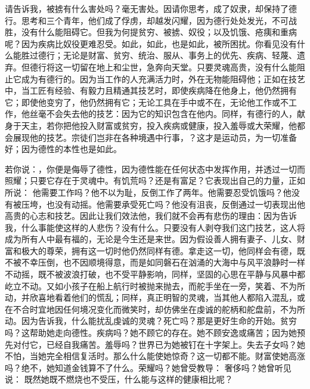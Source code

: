 请告诉我，被掳有什么害处吗？毫无害处。因请你思考，成了奴隶，却保持了德行。思考和三个青年，他们成了俘虏，却越发闪耀，因为德行处处发光，不可战胜，没有什么能阻碍它。但我为何提贫穷、被掳、奴役；以及饥饿、疮痍和重病呢？因为疾病比奴役更难忍受。如此，如此，也是如此，被所困扰。你看见没有什么能胜过德行；无论是财富、贫穷、统治、服从、事务上的优先、疾病、轻蔑、遗弃。但德行将这一切留在地上和尘世，急奔向天堂。只要灵魂高贵，没有什么能阻止它成为有德行的。因为当工作的人充满活力时，外在无物能阻碍他；正如在技艺中，当工匠有经验、有毅力且精通其技艺时，即使疾病降在他身上，他仍然拥有它；即使他变穷了，他仍然拥有它；无论工具在手中或不在，无论他工作或不工作，他丝毫不会失去他的技艺：因为它的知识包含在他内。同样，有德行的人，献身于天主，若你把他投入财富或贫穷，投入疾病或健康，投入羞辱或大荣耀，他都会展现他的技艺。宗徒们岂非在各种境遇中行事，？这才是运动员，为一切准备好；因为德性的本性也是如此。\par

若你说：，你便是侮辱了德性，因为德性能在任何状态中发挥作用，并透过一切而照耀；只要它存在于灵魂中。有饥荒吗？还是有富足？它表现出自己的力量，正如所说： 他需要工作吗？他不以为耻，反倒工作了两年。他需要忍受饥饿吗？他没有被压垮，也没有动摇。他需要承受死亡吗？他没有沮丧，反倒通过一切表现出他高贵的心志和技艺。因此让我们效法他，我们就不会再有悲伤的理由：因为告诉我，什么事能使这样的人悲伤？没有什么。只要没有人剥夺我们这门技艺，这人将成为所有人中最有福的，无论是今生还是来世。因为假设善人拥有妻子、儿女、财富和极大的尊荣，拥有这一切时他仍然同样有德。拿走这一切，他同样会有德，既不被不幸压倒，也不因顺境得意，而是如同磐石在汹涌的大海中与风平浪静时一样不动摇，既不被波浪打破，也不受平静影响，同样，坚固的心思在平静与风暴中都屹立不动。又如小孩子在船上航行时被抛来抛去，而舵手坐在一旁，笑着、不为所动，并欣喜地看着他们的慌乱；同样，真正明智的灵魂，当其他人都陷入混乱，或在不合时宜地因任何境况变化而微笑时，却仿佛坐在虔诚的舵柄和舵盘前，不为所动。因为告诉我，什么能扰乱虔诚的灵魂？死亡吗？那是更好生命的开始。贫穷吗？这帮助她走向德性。疾病吗？她不顾它的存在。她不顾安逸或痛苦；因为她预先对付它，已经自我痛苦。羞辱吗？世界已为她被钉在十字架上。失去子女吗？她不怕，当她完全相信复活时。那么什么能使她惊奇？这一切都不能。财富使她高涨吗？绝不，她知道金钱算不了什么。荣耀吗？她曾受教导： 奢侈吗？她曾听见说： 既然她既不燃烧也不受压，什么能与这样的健康相比呢？\par

